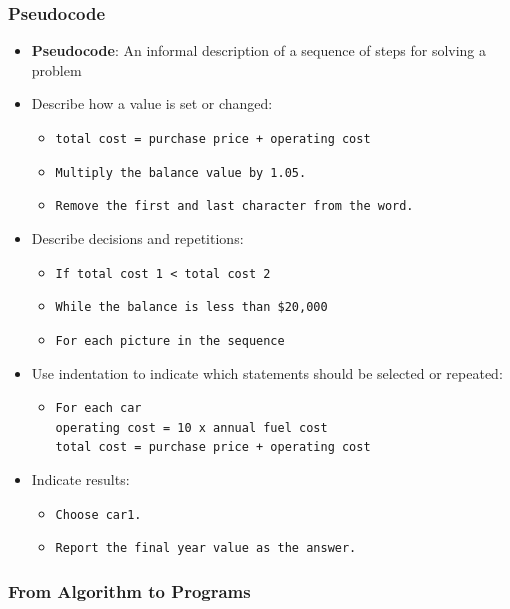 \documentclass{beamer}
\begin{document}
\begin{frame}[t,fragile] \frametitle{Pseudocode} %
    \begin{itemize}
        \item \textbf{Pseudocode}: An informal description of a sequence of steps for solving a problem
        \item Describe how a value is set or changed:
        \begin{itemize}
            \item \texttt{total cost = purchase price + operating cost}
            \item \texttt{Multiply the balance value by 1.05.}
            \item \texttt{Remove the first and last character from the word.}
        \end{itemize}
        \item Describe decisions and repetitions:
        \begin{itemize}
            \item \texttt{If total cost 1 < total cost 2}
            \item \texttt{While the balance is less than \$20,000}
            \item \texttt{For each picture in the sequence}
        \end{itemize}
        \item Use indentation to indicate which statements should be selected or repeated:
        \begin{itemize}
            \item[] \texttt{For each car}\\
                    \quad \texttt{operating cost = 10 x annual fuel cost}\\
                    \quad \texttt{total cost = purchase price + operating cost}
        \end{itemize}
        \item Indicate results:
        \begin{itemize}
            \item \texttt{Choose car1.}
            \item \texttt{Report the final year value as the answer.}
        \end{itemize}
    \end{itemize}
\end{frame}

\begin{frame}[t,fragile] \frametitle{From Algorithm to Programs} %
\end{frame}
\end{document}

